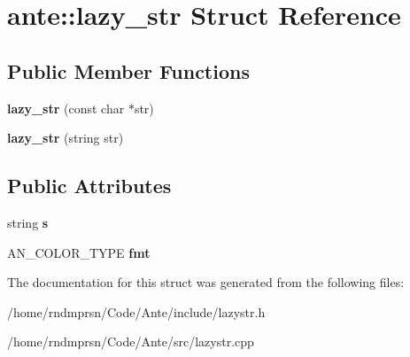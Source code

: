 \hypertarget{structante_1_1lazy__str}{}\section{ante\+:\+:lazy\+\_\+str Struct Reference}
\label{structante_1_1lazy__str}
\subsection*{Public Member Functions}
\begin{DoxyCompactItemize}
\item 
\mbox{\label{structante_1_1lazy__str_aa3bb1da0a6f726c4ee19c70634676367}} 
{\bfseries lazy\+\_\+str} (const char $\ast$str)
\item 
\mbox{\label{structante_1_1lazy__str_a80f1064abbb3fcf280a792701207038b}} 
{\bfseries lazy\+\_\+str} (string str)
\end{DoxyCompactItemize}
\subsection*{Public Attributes}
\begin{DoxyCompactItemize}
\item 
\mbox{\label{structante_1_1lazy__str_a6854aa0bec794b3fbdc5a89e2e4e9ace}} 
string {\bfseries s}
\item 
\mbox{\label{structante_1_1lazy__str_afabcbf14036a71c9e1412f187301d5eb}} 
A\+N\+\_\+\+C\+O\+L\+O\+R\+\_\+\+T\+Y\+PE {\bfseries fmt}
\end{DoxyCompactItemize}


The documentation for this struct was generated from the following files\+:\begin{DoxyCompactItemize}
\item 
/home/rndmprsn/\+Code/\+Ante/include/lazystr.\+h\item 
/home/rndmprsn/\+Code/\+Ante/src/lazystr.\+cpp\end{DoxyCompactItemize}
